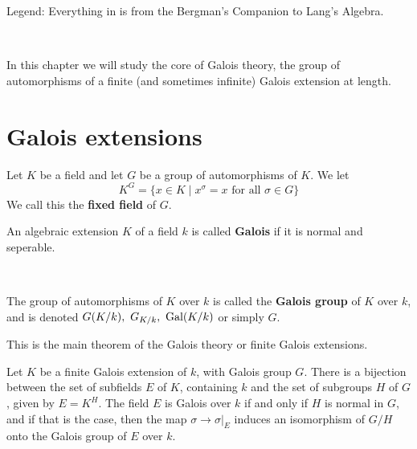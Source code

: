 
Legend: Everything in  is from the Bergman's Companion to Lang's Algebra.

\

In this chapter we will study the core of Galois theory, the group of automorphisms of a finite (and sometimes infinite) Galois extension at length.
    \section{Galois extensions}
\begin{definition}
    Let $K$ be a field and let $G$ be a group of automorphisms of $K$. We let \[K^G = \{x\in K\mid x^\sigma = x \text{ for all }\sigma \in G\}\]We call this the \textbf{fixed field} of $G$. 
\end{definition}

\begin{definition}
    An algebraic extension $K$ of a field $k$ is called \textbf{Galois} if it is normal and seperable.

    \

    The group of automorphisms of $K$ over $k$ is called the \textbf{Galois group} of $K$ over $k$, and is denoted $G(K/k), \ G_{K/k}, \ \Gal{K/k}$ or simply $G$.
\end{definition}

This is the main theorem of the Galois theory or finite Galois extensions.
\begin{theorem}\label{main}
    Let $K$ be a finite Galois extension of $k$, with Galois group $G$. There is a bijection between the set of subfields $E$ of $K$, containing $k$ and the set of subgroups $H$ of $G$, given by $E=K^H$. The field $E$ is Galois over $k$ if and only if $H$ is normal in $G$, and if that is the case, then the map $\sigma\rightarrow \sigma|_E$ induces an isomorphism
    of $G/H$ onto the Galois group of $E$ over $k$.
\end{theorem}

